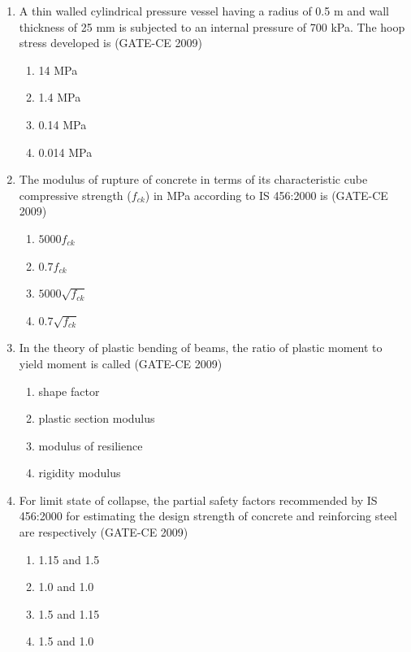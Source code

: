\documentclass[journal,12pt,onecolumn]{article}
\theoremstyle{remark}
\begin{document}
\begin{enumerate}
    \item A thin walled cylindrical pressure vessel having a radius of 0.5 m and wall thickness of 25 mm is subjected to an internal pressure of 700 kPa. The hoop stress developed is (GATE-CE 2009)
    \begin{multicols}{2}
    \begin{enumerate}
        \item 14 MPa 
        \item 1.4 MPa 
        \item 0.14 MPa 
        \item 0.014 MPa
    \end{enumerate}
    \end{multicols}
    
    \item The modulus of rupture of concrete in terms of its characteristic cube compressive strength ($f_{ck}$) in MPa according to IS 456:2000 is (GATE-CE 2009)
    \begin{multicols}{2}
    \begin{enumerate}
        \item $5000f_{ck}$ 
        \item $0.7f_{ck}$ 
        \item $5000\sqrt{f_{ck}}$ 
        \item $0.7\sqrt{f_{ck}}$
    \end{enumerate}
    \end{multicols}
    
    \item In the theory of plastic bending of beams, the ratio of plastic moment to yield moment is called (GATE-CE 2009)
    \begin{multicols}{2}
    \begin{enumerate}
        \item shape factor 
        \item plastic section modulus 
        \item modulus of resilience 
        \item rigidity modulus
    \end{enumerate}
    \end{multicols}
    
    \item For limit state of collapse, the partial safety factors recommended by IS 456:2000 for estimating the design strength of concrete and reinforcing steel are respectively (GATE-CE 2009)
    \begin{multicols}{2}
    \begin{enumerate}
        \item 1.15 and 1.5 
        \item 1.0 and 1.0 
        \item 1.5 and 1.15 
        \item 1.5 and 1.0
    \end{enumerate}
    \end{multicols}
    

\end{enumerate}
\end{document}
